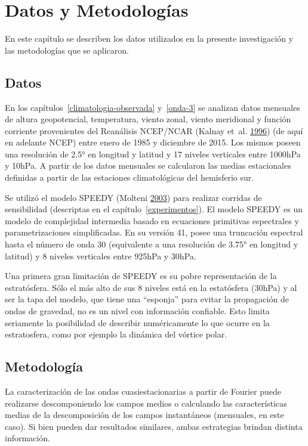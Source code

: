 \documentclass[spanish,a4paper,12p]{book}
\begin{document}
\chapter{Datos y Metodologías}\label{datos-y-metodologias}

En este capítulo se describen los datos utilizados en la presente
investigación y las metodologías que se aplicaron.

\section{Datos}\label{datos}

En los capítulos~\ref{climatologia-observada} y~\ref{onda-3} se analizan
datos mensuales de altura geopotencial, temperatura, viento zonal,
viento meridional y función corriente provenientes del Reanálisis
NCEP/NCAR (Kalnay et~al. \protect\hyperlink{ref-Kalnay1996}{1996}) (de
aquí en adelante NCEP) entre enero de 1985 y diciembre de 2015. Los
mismos poseen una resolución de 2.5° en longitud y latitud y 17 niveles
verticales entre 1000hPa y 10hPa. A partir de los datos mensuales se
calcularon las medias estacionales definidas a partir de las estaciones
climatológicas del hemisferio sur.

Se utilizó el modelo SPEEDY (Molteni
\protect\hyperlink{ref-Molteni2003}{2003}) para realizar corridas de
sensibilidad (descriptas en el capítulo~\ref{experimentos}). El modelo
SPEEDY es un modelo de complejidad intermedia basado en ecuaciones
primitivas espectrales y parametrizaciones simplificadas. En su versión
41, posee una truncación espectral hasta el número de onda 30
(equivalente a una resolución de 3.75° en longitud y latitud) y 8
niveles verticales entre 925hPa y 30hPa.

Una primera gran limitación de SPEEDY es su pobre representación de la
estratósfera. Sólo el más alto de sus 8 niveles está en la estatósfera
(30hPa) y al ser la tapa del modelo, que tiene una ``esponja'' para
evitar la propagación de ondas de gravedad, no es un nivel con
información confiable. Esto limita seriamente la posibilidad de
describir numéricamente lo que ocurre en la estratosfera, como por
ejemplo la dinámica del vórtice polar.

\section{Metodología}\label{metodologia}

La caracterización de las ondas cuasiestacionarias a partir de Fourier
puede realizarse descomponiendo los campos medios o calculando las
características medias de la descomposición de los campos instantáneos
(mensuales, en este caso). Si bien pueden dar resultados similares,
ambas estrategias brindan distinta información.
\end{document}
